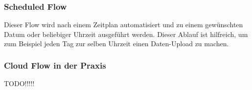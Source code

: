 \subsubsection{Scheduled Flow}
Dieser Flow wird nach einem Zeitplan automatisiert und zu einem gewünschten Datum oder beliebiger Uhrzeit ausgeführt werden. Dieser Ablauf ist hilfreich, um zum Beispiel jeden Tag zur selben Uhrzeit einen Daten-Upload zu machen.

\subsubsection{Cloud Flow in der Praxis}
TODO!!!!!
